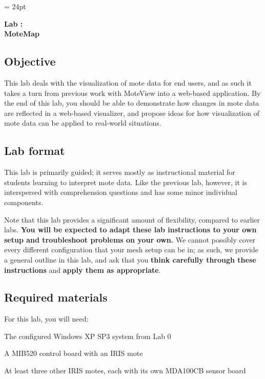 \documentclass{article}
\begin{document}
\chead{\textcolor{Gray}{CSSE491 -- Mesh Networking Lab Assignment}}
\headsep = 24pt

\begin{center}
{ \large
\textbf{Lab \labnumber: \longproductname} \\
\textbf{MoteMap}
}
\end{center}

\subsection*{Objective}
This lab deals with the visualization of mote data for end users, and as such it takes a turn from previous work with MoteView into a web-based application. By the end of this lab, you should be able to demonstrate how changes in mote data are reflected in a web-based visualizer, and propose ideas for how visualization of mote data can be applied to real-world situations.

\subsection*{Lab format}
This lab is primarily guided; it serves mostly as instructional material for students learning to interpret mote data. Like the previous lab, however, it is interspersed with comprehension questions and has some minor individual components.

Note that this lab provides a significant amount of flexibility, compared to earlier labs. \textbf{You will be expected to adapt these lab instructions to your own setup and troubleshoot problems on your own.} We cannot possibly cover every different configuration that your mesh setup can be in; as such, we provide a general outline in this lab, and ask that you \textbf{think carefully through these instructions} and \textbf{apply them as appropriate}.

\subsection*{Required materials}
For this lab, you will need:

\begin{itemize*}
\item The configured Windows XP SP3 system from Lab 0
\item A MIB520 control board with an IRIS mote
\item At least three other IRIS motes, each with its own MDA100CB sensor board
\end{itemize*}
\end{document}
